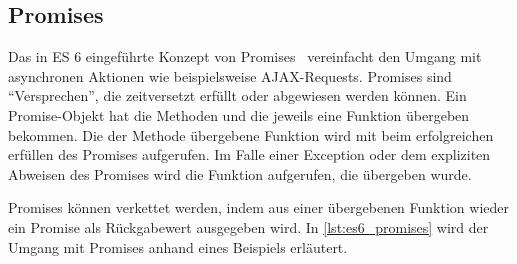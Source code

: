 \subsection{Promises}
\label{ssec:ge_promises}

Das in ES 6 eingeführte Konzept von Promises~\cite{promises} vereinfacht den
Umgang mit asynchronen Aktionen wie beispielsweise AJAX-Requests.  Promises
sind \enquote{Versprechen}, die zeitversetzt erfüllt oder abgewiesen werden
können.  Ein Promise-Objekt hat die Methoden  und
 die jeweils eine Funktion übergeben bekommen.  Die der Methode
 übergebene Funktion wird mit beim erfolgreichen erfüllen des
Promises aufgerufen.  Im Falle einer Exception oder dem expliziten Abweisen
des Promises wird die Funktion aufgerufen, die  übergeben wurde.

Promises können verkettet werden, indem aus einer  übergebenen
Funktion wieder ein Promise als Rückgabewert ausgegeben wird.  In
\cref{lst:es6_promises} wird der Umgang mit Promises anhand eines Beispiels
erläutert.


